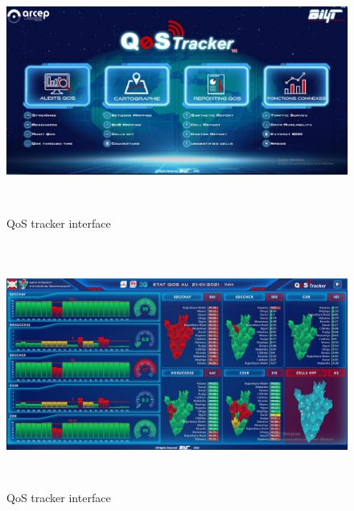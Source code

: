 \begin{figure}[H]
    \centering
    \includegraphics[height=8cm]{images/chap1/QoStrackerV4.png}
    \caption{QoS tracker interface}
    \label{fig:enter-label}
\end{figure}
\begin{figure}[H]
    \centering
    \includegraphics[height=8cm]{images/chap1/QoStrackerV4_1.png}
    \caption{QoS tracker interface}
    \label{fig:enter-label}
\end{figure}




